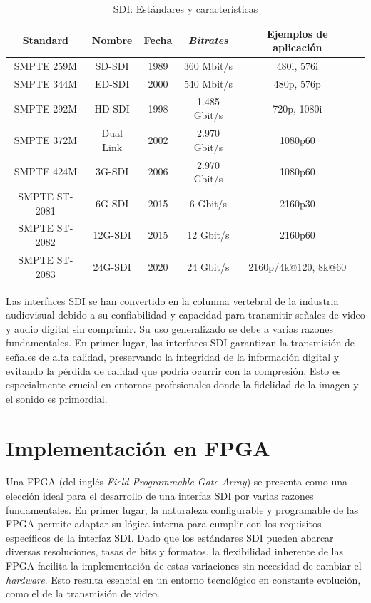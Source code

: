 \begin{table}[h]
    \centering
    \begin{tabular}{cccccc}
        \toprule
        \textbf{Standard} & \textbf{Nombre} & \textbf{Fecha} & \textbf{\textit{Bitrates}} & \textbf{Ejemplos de aplicación} \\
        \midrule
        SMPTE 259M      & SD-SDI    & 1989 & 360 Mbit/s     & 480i, 576i \\
        SMPTE 344M      & ED-SDI    & 2000 & 540 Mbit/s     & 480p, 576p \\
        SMPTE 292M      & HD-SDI    & 1998 & 1.485 Gbit/s   & 720p, 1080i \\
        SMPTE 372M      & Dual Link & 2002 & 2.970 Gbit/s   & 1080p60 \\
        SMPTE 424M      & 3G-SDI    & 2006 & 2.970 Gbit/s   & 1080p60 \\
        SMPTE ST-2081   & 6G-SDI    & 2015 & 6 Gbit/s       & 2160p30 \\
        SMPTE ST-2082   & 12G-SDI   & 2015 & 12 Gbit/s      & 2160p60 \\
        SMPTE ST-2083   & 24G-SDI   & 2020 & 24 Gbit/s      & 2160p/4k@120, 8k@60 \\
        \bottomrule
    \end{tabular}
    \caption{SDI\@: Estándares y características}\label{tab:sdi_standards}
\end{table}

Las interfaces SDI se han convertido en la columna vertebral de la industria
audiovisual debido a su confiabilidad y capacidad para transmitir señales de
video y audio digital sin comprimir. Su uso generalizado se debe a varias
razones fundamentales. En primer lugar, las interfaces SDI garantizan la
transmisión de señales de alta calidad, preservando la integridad de la
información digital y evitando la pérdida de calidad que podría ocurrir con la
compresión. Esto es especialmente crucial en entornos profesionales donde la
fidelidad de la imagen y el sonido es primordial.

\section{Implementación en FPGA}

Una FPGA (del inglés \textit{Field-Programmable Gate Array}) se presenta como
una elección ideal para el desarrollo de una interfaz SDI por varias razones
fundamentales. En primer lugar, la naturaleza configurable y programable de las
FPGA permite adaptar su lógica interna para cumplir con los requisitos
específicos de la interfaz SDI\@. Dado que los estándares SDI pueden abarcar
diversas resoluciones, tasas de bits y formatos, la flexibilidad inherente de
las FPGA facilita la implementación de estas variaciones sin necesidad de
cambiar el \textit{hardware}. Esto resulta esencial en un entorno tecnológico
en constante evolución, como el de la transmisión de video.

